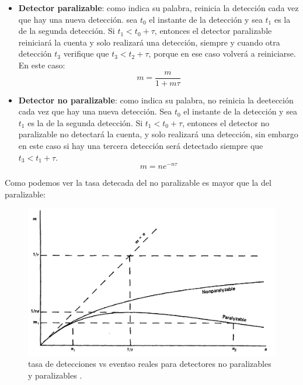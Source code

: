 \begin{itemize}
    \begin{itemize}
        \item \textbf{Detector paralizable}: como indica su palabra, reinicia la detección cada vez que hay una nueva detección. sea $t_0$ el instante de la detección y sea $t_1$ es la de la segunda detección. Si $t_1<t_0+\tau$, entonces el detector paralizable reiniciará la cuenta y solo realizará una detección, siempre y cuando otra detección $t_3$ verifique que $t_3<t_2+\tau$, porque en ese caso volverá a reiniciarse. En este caso:
        \begin{equation}
            m = \frac{m}{1+m\tau}
        \end{equation}
        \item \textbf{Detector no paralizable}: como indica su palabra, no reinicia la deetección cada vez que hay una nueva detección. Sea $t_0$ el instante de la detección y sea $t_1$ es la de la segunda detección. Si $t_1<t_0+\tau$, entonces el detector no paralizable no detectará la cuenta, y solo realizará una detección, sin embargo en este caso si hay una tercera detección será detectado siempre que $t_3<t_1+\tau$. 
        \begin{equation}
            m = n e^{-n \tau}
        \end{equation}
    \end{itemize}
    Como podemos ver la tasa detecada del no paralizable es mayor que la del paralizable: 
    \begin{figure}[H] \centering
        \caption{tasa de detecciones vs eventso reales para detectores no paralizables y paralizables \cite{Knoll:1300754}.}
        \includegraphics[width=0.7\linewidth]{Cuerpo/Ch_01/Detectores_muerto.png}
    \end{figure}
    
\end{itemize}
